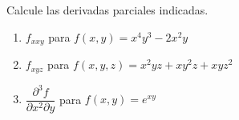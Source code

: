 Calcule las derivadas parciales indicadas.
\begin{enumerate}
    \item $f_{xxy}$ para $f(x, y) = x^4 y^3 - 2x^2 y$
    \item $f_{xyz}$ para $f(x, y, z) = x^2 yz + xy^2 z + xyz^2$
    \item $\dfrac{\partial^3 f}{\partial x^2 \partial y}$ para $f(x, y) = e^{xy}$
\end{enumerate}
